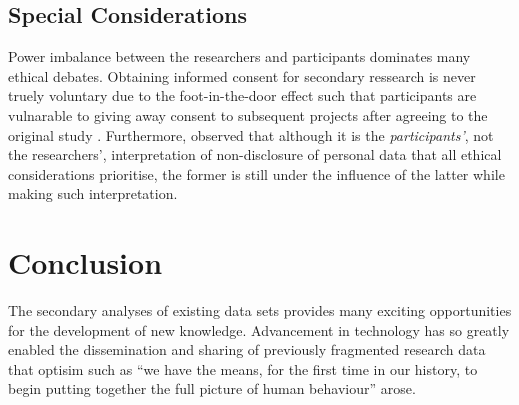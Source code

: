 \documentclass[
        a4paper, %
        12pt, %
        stu, %
        noextraspace, %
        floatsintext, %
        biblatex, %
        twoside, %
        colorlinks=true,        %
        linkcolor=red,          %
        anchorcolor=red,      %
        citecolor=blue,         %
        urlcolor=blue,          %
        bookmarks=true,         %
        bookmarksopen=false,    %
        bookmarksnumbered=true,  %
        dvipsnames
]{apa7}
\begin{document}
\subsection{Special Considerations}

Power imbalance between the researchers and participants dominates many ethical debates. Obtaining informed consent for secondary ressearch is never truely voluntary due to the foot-in-the-door effect \parencite{freedman:1966} such that participants are vulnarable to giving away consent to subsequent projects after agreeing to the original study \parencite{law:2005}. Furthermore, \textcite{law:2005} observed that although it is the \emph{participants'}, not the researchers', interpretation of non-disclosure of personal data that all ethical considerations prioritise, the former is still under the influence of the latter while making such interpretation.


\section{Conclusion}

The secondary analyses of existing data sets provides many exciting opportunities for the development of new knowledge. Advancement in technology has so greatly enabled the dissemination and sharing of previously fragmented research data that optisim such as ``we have the means, for the first time in our history, to begin putting together the full picture of human behaviour'' \parencite[][p. 212]{johnson:2001} arose.


\printbibliography
\end{document}
